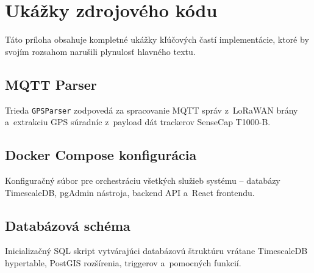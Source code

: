 \chapter{Ukážky zdrojového kódu}
\label{sec:AppendixCode}

Táto príloha obsahuje kompletné ukážky kľúčových častí implementácie, ktoré by svojím rozsahom narušili plynulosť hlavného textu.

\section{MQTT Parser}
\label{sec:AppendixParser}

Trieda \texttt{GPSParser} zodpovedá za spracovanie MQTT správ z~LoRaWAN brány a~extrakciu GPS súradníc z~payload dát trackerov SenseCap T1000-B.




\section{Docker Compose konfigurácia}
\label{sec:AppendixDocker}

Konfiguračný súbor pre orchestráciu všetkých služieb systému -- databázy TimescaleDB, pgAdmin nástroja, backend API a~React frontendu.




\section{Databázová schéma}
\label{sec:AppendixSchema}

Inicializačný SQL skript vytvárajúci databázovú štruktúru vrátane TimescaleDB hypertable, PostGIS rozšírenia, triggerov a~pomocných funkcií.



\endinput

